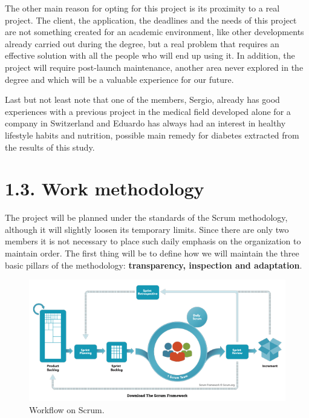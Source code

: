 	The other main reason for opting for this project is its proximity to a real project. The client, the application, the deadlines and the needs of this project are not something created for an academic environment, like other developments already carried out during the degree, but a real problem that requires an effective solution with all the people who will end up using it. In addition, the project will require post-launch maintenance, another area never explored in the degree and which will be a valuable experience for our future.\newline
	
	Last but not least note that one of the members, Sergio, already has good experiences with a previous project in the medical field developed alone for a company in Switzerland and Eduardo has always had an interest in healthy lifestyle habits and nutrition, possible main remedy for diabetes extracted from the results of this study.\newpage

	\section*{1.3. Work methodology}
    
    The project will be planned under the standards of the Scrum\cite{Scrum} methodology, although it will slightly loosen its temporary limits. Since there are only two members it is not necessary to place such daily emphasis on the organization to maintain order. The first thing will be to define how we will maintain the three basic pillars of the methodology: \textbf{transparency, inspection and adaptation}.
    
    \begin{figure}[h]
    \centering
     \includegraphics[width=1\textwidth]{images/Scrum.png}
    \caption{Workflow on Scrum.}
    \end{figure}
    
